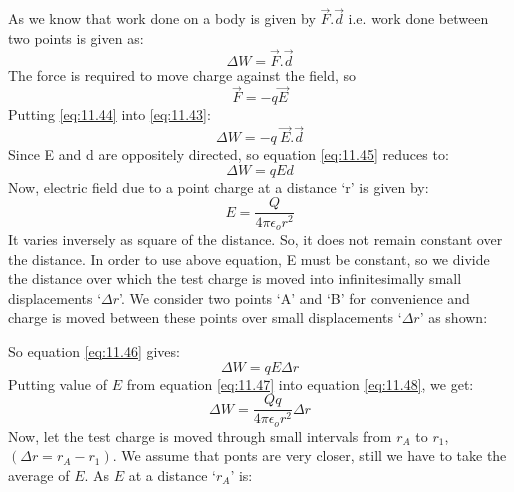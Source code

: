 As we know that work done on a
body is given by $\vec{F}.\vec{d}$ i.e. work done between two points is given as:
\begin{equation}\label{eq:11.43}
  \Delta W = \vec{F} . \vec{d} 
\end{equation}
The force is required to move charge against the field, so
\begin{equation} \label{eq:11.44}
  \vec{F} = - q\vec{E}
\end{equation}
Putting \ref{eq:11.44} into \ref{eq:11.43}:
\begin{equation}\label{eq:11.45}
  \Delta W = -q\:\vec{E} . \vec{d} 
\end{equation}
Since E and d are oppositely directed, so equation \ref{eq:11.45} reduces to:
\begin{equation}\label{eq:11.46}
  \Delta W = qEd 
\end{equation}
Now, electric field due to a point charge at a distance ‘r’ is given by:
\begin{equation}\label{eq:11.47}
  E = \frac{Q}{4\pi\epsilon_{o} r^{2}}
\end{equation}
It varies inversely as square of the distance.
So, it does not remain constant over the distance. In order to use above equation,
E must be constant, so we divide the distance over which the test
charge is moved into infinitesimally small displacements ‘$\Delta r$'.
We consider two points ‘A’ and ‘B’ for convenience and charge is
moved between these points over small displacements ‘$\Delta r$' as shown:

So equation \ref{eq:11.46} gives:
\begin{equation}\label{eq:11.48}
  \Delta W = qE\Delta r
\end{equation}
Putting value of $E$ from equation \ref{eq:11.47} into equation \ref{eq:11.48},
we get:
\begin{equation}\label{eq:11.49}
  \Delta W = \frac{Qq}{4\pi\epsilon_{o} r^{2}} \Delta r
\end{equation}
Now, let the test charge is moved through small intervals from $r_{A}$
to $r_{1}$, $(\Delta r = r_{A} - r_{1})$. We assume that ponts are very closer,
still we have to take the average of $E$. As $E$ at a distance `$r_{A}$' is:



